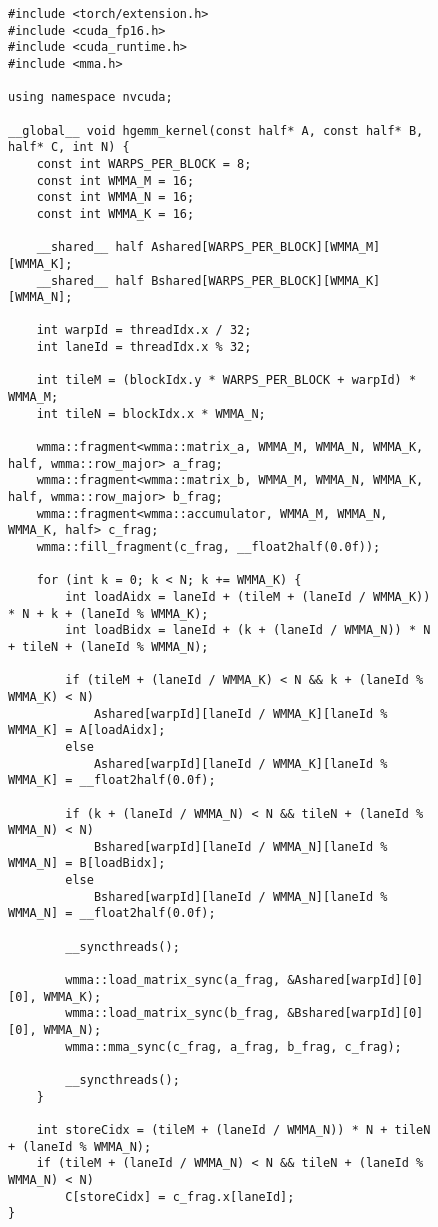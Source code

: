 \begin{figure}
\begin{lstlisting}
#include <torch/extension.h>
#include <cuda_fp16.h>
#include <cuda_runtime.h>
#include <mma.h>

using namespace nvcuda;

__global__ void hgemm_kernel(const half* A, const half* B, half* C, int N) {
    const int WARPS_PER_BLOCK = 8;
    const int WMMA_M = 16;
    const int WMMA_N = 16;
    const int WMMA_K = 16;
    
    __shared__ half Ashared[WARPS_PER_BLOCK][WMMA_M][WMMA_K];
    __shared__ half Bshared[WARPS_PER_BLOCK][WMMA_K][WMMA_N];

    int warpId = threadIdx.x / 32;
    int laneId = threadIdx.x % 32;
    
    int tileM = (blockIdx.y * WARPS_PER_BLOCK + warpId) * WMMA_M;
    int tileN = blockIdx.x * WMMA_N;
    
    wmma::fragment<wmma::matrix_a, WMMA_M, WMMA_N, WMMA_K, half, wmma::row_major> a_frag;
    wmma::fragment<wmma::matrix_b, WMMA_M, WMMA_N, WMMA_K, half, wmma::row_major> b_frag;
    wmma::fragment<wmma::accumulator, WMMA_M, WMMA_N, WMMA_K, half> c_frag;
    wmma::fill_fragment(c_frag, __float2half(0.0f));

    for (int k = 0; k < N; k += WMMA_K) {
        int loadAidx = laneId + (tileM + (laneId / WMMA_K)) * N + k + (laneId % WMMA_K);
        int loadBidx = laneId + (k + (laneId / WMMA_N)) * N + tileN + (laneId % WMMA_N);
        
        if (tileM + (laneId / WMMA_K) < N && k + (laneId % WMMA_K) < N)
            Ashared[warpId][laneId / WMMA_K][laneId % WMMA_K] = A[loadAidx];
        else
            Ashared[warpId][laneId / WMMA_K][laneId % WMMA_K] = __float2half(0.0f);

        if (k + (laneId / WMMA_N) < N && tileN + (laneId % WMMA_N) < N)
            Bshared[warpId][laneId / WMMA_N][laneId % WMMA_N] = B[loadBidx];
        else
            Bshared[warpId][laneId / WMMA_N][laneId % WMMA_N] = __float2half(0.0f);

        __syncthreads();

        wmma::load_matrix_sync(a_frag, &Ashared[warpId][0][0], WMMA_K);
        wmma::load_matrix_sync(b_frag, &Bshared[warpId][0][0], WMMA_N);
        wmma::mma_sync(c_frag, a_frag, b_frag, c_frag);
        
        __syncthreads();
    }

    int storeCidx = (tileM + (laneId / WMMA_N)) * N + tileN + (laneId % WMMA_N);
    if (tileM + (laneId / WMMA_N) < N && tileN + (laneId % WMMA_N) < N)
        C[storeCidx] = c_frag.x[laneId];
}


\end{lstlisting}
\end{figure}
